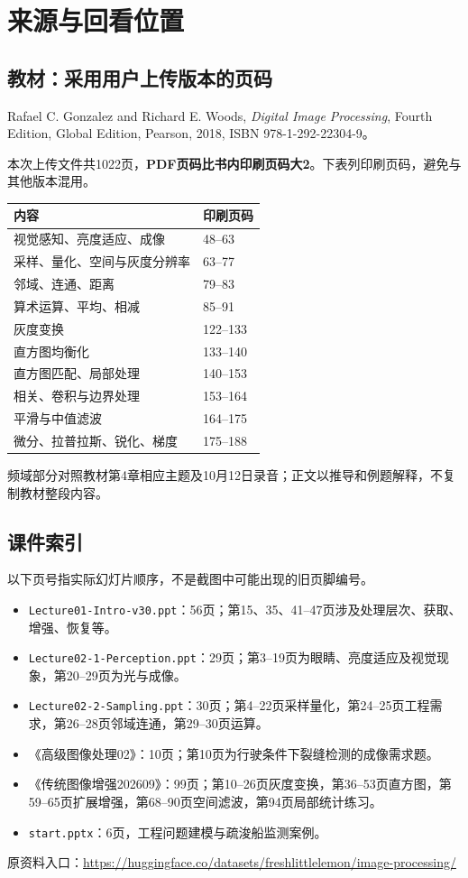 \clearpage
\section{来源与回看位置}
\subsection{教材：采用用户上传版本的页码}
Rafael C. Gonzalez and Richard E. Woods, \emph{Digital Image Processing}, Fourth Edition, Global Edition, Pearson, 2018, ISBN 978-1-292-22304-9。\par
本次上传文件共1022页，\textbf{PDF页码比书内印刷页码大2}。下表列印刷页码，避免与其他版本混用。
\begin{center}
\begin{tabular}{p{.60\linewidth}p{.22\linewidth}}
\toprule
内容 & 印刷页码\\
\midrule
视觉感知、亮度适应、成像 & 48--63\\
采样、量化、空间与灰度分辨率 & 63--77\\
邻域、连通、距离 & 79--83\\
算术运算、平均、相减 & 85--91\\
灰度变换 & 122--133\\
直方图均衡化 & 133--140\\
直方图匹配、局部处理 & 140--153\\
相关、卷积与边界处理 & 153--164\\
平滑与中值滤波 & 164--175\\
微分、拉普拉斯、锐化、梯度 & 175--188\\
\bottomrule
\end{tabular}
\end{center}
\noindent 频域部分对照教材第4章相应主题及10月12日录音；正文以推导和例题解释，不复制教材整段内容。
\subsection{课件索引}
以下页号指实际幻灯片顺序，不是截图中可能出现的旧页脚编号。
\begin{itemize}
\item \texttt{Lecture01-Intro-v30.ppt}：56页；第15、35、41--47页涉及处理层次、获取、增强、恢复等。
\item \texttt{Lecture02-1-Perception.ppt}：29页；第3--19页为眼睛、亮度适应及视觉现象，第20--29页为光与成像。
\item \texttt{Lecture02-2-Sampling.ppt}：30页；第4--22页采样量化，第24--25页工程需求，第26--28页邻域连通，第29--30页运算。
\item 《高级图像处理02》：10页；第10页为行驶条件下裂缝检测的成像需求题。
\item 《传统图像增强202609》：99页；第10--26页灰度变换，第36--53页直方图，第59--65页扩展增强，第68--90页空间滤波，第94页局部统计练习。
\item \texttt{start.pptx}：6页，工程问题建模与疏浚船监测案例。
\end{itemize}
\noindent 原资料入口：\url{https://huggingface.co/datasets/freshlittlelemon/image-processing/}
